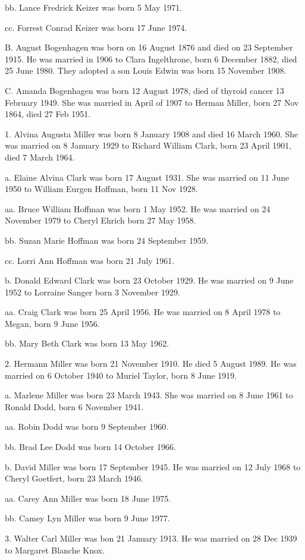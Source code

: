 \documentclass[a4paper]{article}
\begin{document}
bb. Lance Fredrick Keizer was born 5 May 1971.

cc. Forrest Conrad Keizer was born 17 June 1974.

B. August Bogenhagen was born on 16 August 1876 and died on 23 September 1915. He was married in 1906 to Clara Ingelthrone, born 6 December 1882, died 25 June 1980.  They adopted a son Louis Edwin was born 15 November 1908.

C. Amanda Bogenhagen was born 12 August 1978, died of thyroid cancer 13 February 1949.  She was married in April of 1907 to Herman Miller, born 27 Nov 1864, died 27 Feb 1951.

1. Alvina Augusta Miller was born 8 January 1908 and died 16 March 1960.  She was married on 8 January 1929 to Richard William Clark, born 23 April 1901, died 7 March 1964.

a. Elaine Alvina Clark was born 17 August 1931.  She was married on 11 June 1950 to William Eurgen Hoffman, born 11 Nov 1928.

aa. Bruce William Hoffman was born 1 May 1952.  He was married on 24 November 1979 to Cheryl Ehrich born 27 May 1958.

bb. Suzan Marie Hoffman was born 24 September 1959.

cc. Lorri Ann Hoffman was born 21 July 1961.

b. Donald Edward Clark was born 23 October 1929.  He was married on 9 June 1952 to Lorraine Sanger born 3 November 1929.
 
aa. Craig Clark was born 25 April 1956.  He was married on 8 April 1978 to Megan, born 9 June 1956.
				
bb. Mary Beth Clark was born 13 May 1962.

2. Hermann Miller was born 21 November 1910. He died 5 August 1989. He was married on 6 October 1940 to Muriel Taylor, born 8 June 1919.

a. Marlene Miller was born 23 March 1943.  She was married on 8 June 1961 to Ronald Dodd, born 6 November 1941.

aa. Robin Dodd was born 9 September 1960.

bb. Brad Lee Dodd was born 14 October 1966.

b. David Miller was born 17 September 1945.  He was married on 12 July 1968 to Cheryl Goetfert, born 23 March 1946.

aa. Carey Ann Miller was born 18 June 1975.

bb. Camey Lyn Miller was born 9 June 1977.

3. Walter Carl Miller was bon 21 January 1913.  He was married on 28 Dec 1939 to Margaret Blanche Knox.
\end{document}
